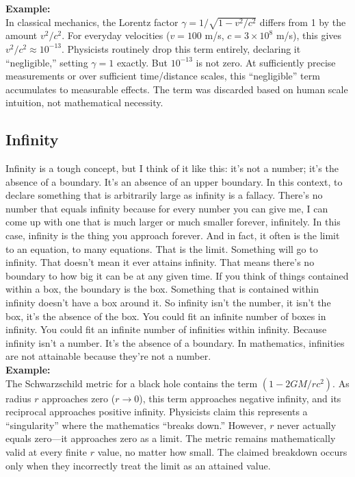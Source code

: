 \documentclass[twoside,twocolumn,9pt]{article}
\begin{document}
\noindent\textbf{Example:}\\
In classical mechanics, the Lorentz factor $\gamma = 1/\sqrt{1 - v^2/c^2}$ differs from 1 by the amount $v^2/c^2$. For everyday velocities ($v = 100$ m/s, $c = 3\times10^{8}$ m/s), this gives $v^2/c^2 \approx 10^{-13}$. Physicists routinely drop this term entirely, declaring it ``negligible,'' setting $\gamma = 1$ exactly. But $10^{-13}$ is not zero. At sufficiently precise measurements or over sufficient time/distance scales, this ``negligible'' term accumulates to measurable effects. The term was discarded based on human scale intuition, not mathematical necessity.

\subsection{Infinity}
Infinity is a tough concept, but I think of it like this: it's not a number; it's the absence of a boundary. It's an absence of an upper boundary. In this context, to declare something that is arbitrarily large as infinity is a fallacy. There's no number that equals infinity because for every number you can give me, I can come up with one that is much larger or much smaller forever, infinitely. In this case, infinity is the thing you approach forever. And in fact, it often is the limit to an equation, to many equations. That is the limit. Something will go to infinity. That doesn't mean it ever attains infinity. That means there's no boundary to how big it can be at any given time. If you think of things contained within a box, the boundary is the box. Something that is contained within infinity doesn't have a box around it. So infinity isn't the number, it isn't the box, it's the absence of the box. You could fit an infinite number of boxes in infinity. You could fit an infinite number of infinities within infinity. Because infinity isn't a number. It's the absence of a boundary. In mathematics, infinities are not attainable because they're not a number.\\

\noindent\textbf{Example:}\\
The Schwarzschild metric for a black hole contains the term $(1 - 2GM/rc^2)$. As radius $r$ approaches zero ($r \to 0$), this term approaches negative infinity, and its reciprocal approaches positive infinity. Physicists claim this represents a ``singularity'' where the mathematics ``breaks down.'' However, $r$ never actually equals zero---it approaches zero as a limit. The metric remains mathematically valid at every finite $r$ value, no matter how small. The claimed breakdown occurs only when they incorrectly treat the limit as an attained value.
\end{document}
